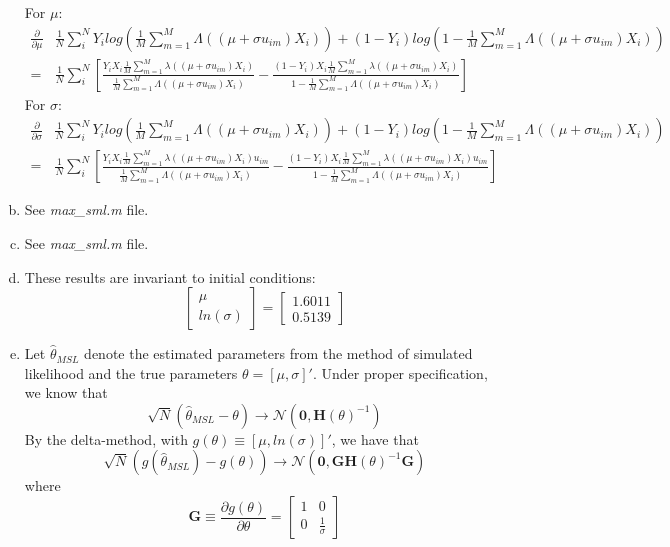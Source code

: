\documentclass[11pt]{article}
\begin{document}
\begin{enumerate}[a)]
	For $\mu$:
	\begin{align*}
		\frac{\partial}{\partial \mu} & \frac{1}{N}\sum_{i}^{N} Y_i log\left(\frac{1}{M}\sum_{m=1}^M\Lambda((\mu+\sigma u_{im})X_i)\right) + (1-Y_i) log\left(1-\frac{1}{M}\sum_{m=1}^M\Lambda((\mu+\sigma u_{im})X_i)\right) \\
		= & \frac{1}{N}\sum_i^N \left[\frac{Y_iX_i\frac{1}{M}\sum_{m=1}^M\lambda((\mu+\sigma u_{im})X_i)}{\frac{1}{M}\sum_{m=1}^M\Lambda((\mu+\sigma u_{im})X_i)} - \frac{(1-Y_i)X_i\frac{1}{M}\sum_{m=1}^M\lambda((\mu+\sigma u_{im})X_i)}{1-\frac{1}{M}\sum_{m=1}^M\Lambda((\mu+\sigma u_{im})X_i)} \right] 
	\end{align*}
	For $\sigma$:
		\begin{align*}
		\frac{\partial}{\partial \sigma} & \frac{1}{N}\sum_{i}^{N} Y_i log\left(\frac{1}{M}\sum_{m=1}^M\Lambda((\mu+\sigma u_{im})X_i)\right) + (1-Y_i) log\left(1-\frac{1}{M}\sum_{m=1}^M\Lambda((\mu+\sigma u_{im})X_i)\right) \\
		= & \frac{1}{N}\sum_i^N \left[\frac{Y_i X_i\frac{1}{M}\sum_{m=1}^M\lambda((\mu+\sigma u_{im})X_i)u_{im}}{\frac{1}{M}\sum_{m=1}^M\Lambda((\mu+\sigma u_{im})X_i)} - \frac{(1-Y_i)X_i\frac{1}{M}\sum_{m=1}^M\lambda((\mu+\sigma u_{im})X_i) u_{im}}{1-\frac{1}{M}\sum_{m=1}^M\Lambda((\mu+\sigma u_{im})X_i)}\right]
		\end{align*}
	\item See \textit{max\_sml.m} file.
	\item See \textit{max\_sml.m} file.
	\item These results are invariant to initial conditions:
	$$\begin{bmatrix}\mu \\ ln(\sigma)\end{bmatrix} 
	= \begin{bmatrix} 1.6011 \\ 0.5139 \end{bmatrix}$$
	\item Let $\hat \theta_{MSL}$ denote the estimated parameters from the method of simulated likelihood and the true parameters $\theta = [\mu, \sigma]'$. Under proper specification, we know that
	$$\sqrt{N}(\hat \theta_{MSL} - \theta) \to 
	\mathcal{N}(\mathbf{0},\mathbf{H}(\theta)^{-1})$$
	By the delta-method, with $g(\theta) \equiv [\mu, ln(\sigma)]'$, we have that
	$$\sqrt{N}(g(\hat \theta_{MSL}) - g(\theta)) \to 
	\mathcal{N}(\mathbf{0},\mathbf{G}\mathbf{H}(\theta)^{-1}\mathbf{G})$$
	where $$\mathbf{G} \equiv \frac{\partial g(\theta)}{\partial \theta} = \begin{bmatrix}1 & 0 \\ 0 & \frac{1}{\sigma}\end{bmatrix}$$


\end{enumerate}
\end{document}
